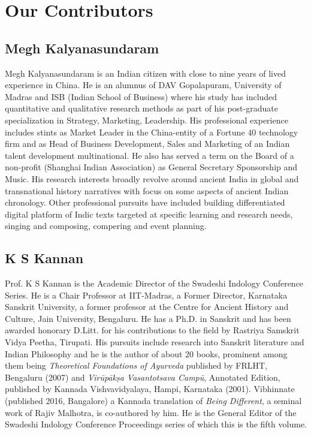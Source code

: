 
\chapter*{Our Contributors }\label{contributors}

\vspace{-1cm}

\section*{Megh Kalyanasundaram}

Megh Kalyanasundaram is an Indian citizen with close to nine years of lived experience in China. He is an alumnus of DAV Gopalapuram, University of Madras and ISB (Indian School of Business) where his study has included quantitative and qualitative research methods as part of his post-graduate specialization in Strategy, Marketing, Leadership. His professional experience includes stints as Market Leader in the China-entity of a Fortune 40 technology firm and as Head of Business Development, Sales and Marketing of an Indian talent development multinational. He also has served a term on the Board of a non-profit (Shanghai Indian Association) as General Secretary Sponsorship and Music. His research interests broadly revolve around ancient India in global and transnational history narratives with focus on some aspects of ancient Indian chronology. Other professional pursuits have included building differentiated digital platform of Indic texts targeted at specific learning and research needs, singing and composing, compering and event planning.

\vspace{-.3cm}

\section*{K S Kannan}

Prof. K S Kannan is the Academic Director of the Swadeshi Indology Conference Series. He is a Chair Professor at IIT-Madras, a Former Director, Karnataka Sanskrit University, a former professor at the Centre for Ancient History and Culture, Jain University, Bengaluru. He has a Ph.D. in Sanskrit and has been awarded honorary D.Litt. for his contributions to the field by Rastriya Samskrit Vidya Peetha, Tirupati. His pursuits include research into Sanskrit literature and Indian Philosophy and he is the author of about 20 books, prominent among them being \textit{Theoretical Foundations of Ayurveda} published by FRLHT, Bengaluru (2007) and \textit{Virūpākṣa Vasantotsava Campū}, Annotated Edition, published by Kannada Vishvavidyalaya, Hampi, Karnataka (2001). Vibhinnate (published 2016, Bangalore) a Kannada translation of \textit{Being Different}, a seminal work of Rajiv Malhotra, is co-authored by him. He is the General Editor of the Swadeshi Indology Conference Proceedings series of which this is the fifth volume.

